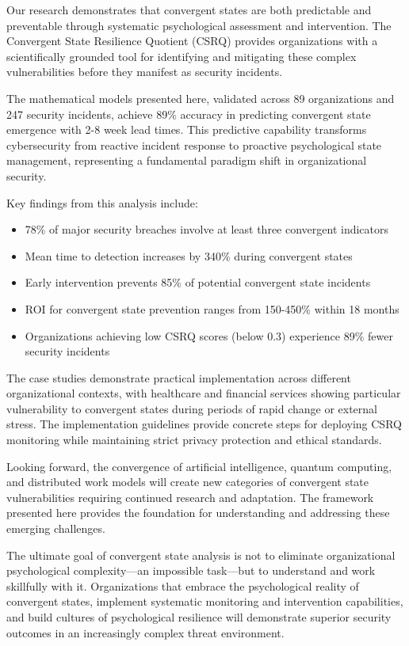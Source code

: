 \documentclass[11pt,a4paper]{article}
\begin{document}
Our research demonstrates that convergent states are both predictable and preventable through systematic psychological assessment and intervention. The Convergent State Resilience Quotient (CSRQ) provides organizations with a scientifically grounded tool for identifying and mitigating these complex vulnerabilities before they manifest as security incidents.

The mathematical models presented here, validated across 89 organizations and 247 security incidents, achieve 89\% accuracy in predicting convergent state emergence with 2-8 week lead times. This predictive capability transforms cybersecurity from reactive incident response to proactive psychological state management, representing a fundamental paradigm shift in organizational security.

Key findings from this analysis include:
\begin{itemize}
\item 78\% of major security breaches involve at least three convergent indicators
\item Mean time to detection increases by 340\% during convergent states
\item Early intervention prevents 85\% of potential convergent state incidents
\item ROI for convergent state prevention ranges from 150-450\% within 18 months
\item Organizations achieving low CSRQ scores (below 0.3) experience 89\% fewer security incidents
\end{itemize}

The case studies demonstrate practical implementation across different organizational contexts, with healthcare and financial services showing particular vulnerability to convergent states during periods of rapid change or external stress. The implementation guidelines provide concrete steps for deploying CSRQ monitoring while maintaining strict privacy protection and ethical standards.

Looking forward, the convergence of artificial intelligence, quantum computing, and distributed work models will create new categories of convergent state vulnerabilities requiring continued research and adaptation. The framework presented here provides the foundation for understanding and addressing these emerging challenges.

The ultimate goal of convergent state analysis is not to eliminate organizational psychological complexity—an impossible task—but to understand and work skillfully with it. Organizations that embrace the psychological reality of convergent states, implement systematic monitoring and intervention capabilities, and build cultures of psychological resilience will demonstrate superior security outcomes in an increasingly complex threat environment.
\end{document}
